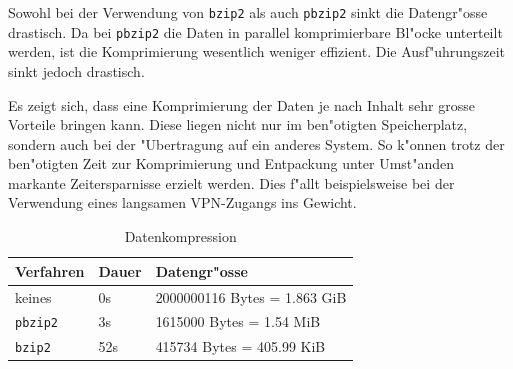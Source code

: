 \begin{refsection}
Sowohl bei der Verwendung von {\tt bzip2} als auch {\tt pbzip2} sinkt
die Datengr"osse drastisch. Da bei {\tt pbzip2} die Daten in parallel
komprimierbare Bl"ocke unterteilt werden, ist die Komprimierung wesentlich
weniger effizient. Die Ausf"uhrungszeit sinkt jedoch drastisch.

Es zeigt sich, dass eine Komprimierung der Daten je nach Inhalt sehr
grosse Vorteile bringen kann. Diese liegen nicht nur im ben"otigten
Speicherplatz, sondern auch bei der "Ubertragung auf ein anderes
System. So k"onnen trotz der ben"otigten Zeit zur Komprimierung und
Entpackung unter Umst"anden markante Zeitersparnisse erzielt werden. Dies
f"allt beispielsweise bei der Verwendung eines langsamen VPN-Zugangs
ins Gewicht.
\begin{table}[ht]\centering
	\begin{tabular}{|l|l|l|}
		\hline
		Verfahren & Dauer & Datengr"osse \\ \hline
		keines & 0s & 2000000116 Bytes = 1.863 GiB \\ \hline
		{\tt pbzip2} & 3s & 1615000 Bytes = 1.54 MiB \\ \hline
		{\tt bzip2} & 52s & 415734 Bytes = 405.99 KiB \\ \hline
	\end{tabular}
	\caption{Datenkompression}
	\label{kompression}
\end{table}

\printbibliography[heading=subbibliography]
\end{refsection}
